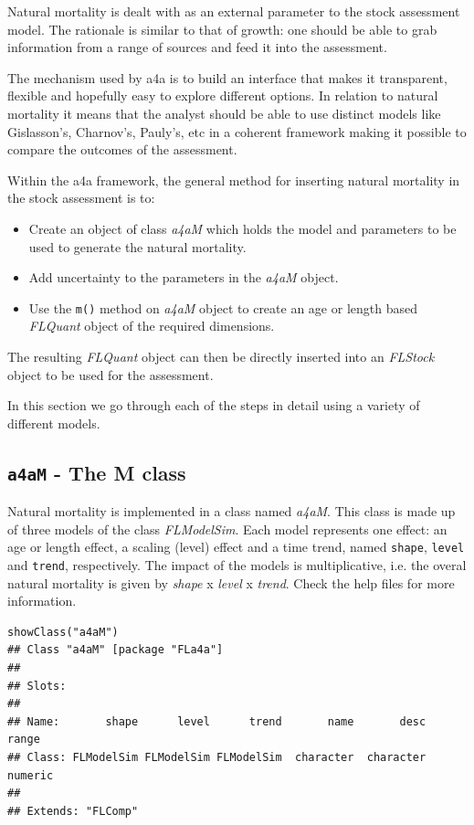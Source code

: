 \documentclass[a4paper,english,10pt]{article}\usepackage[]{graphicx}\usepackage[]{color}
\makeatletter
\newenvironment{kframe}{%
 \def\at@end@of@kframe{}%
 \ifinner\ifhmode%
  \def\at@end@of@kframe{\end{minipage}}%
  \begin{minipage}{\columnwidth}%
 \fi\fi%
 \def\FrameCommand##1{\hskip\@totalleftmargin \hskip-\fboxsep
 \colorbox{shadecolor}{##1}\hskip-\fboxsep
     \hskip-\linewidth \hskip-\@totalleftmargin \hskip\columnwidth}%
 \MakeFramed {\advance\hsize-\width
   \@totalleftmargin\z@ \linewidth\hsize
   \@setminipage}}%
 {\par\unskip\endMakeFramed%
 \at@end@of@kframe}
\newenvironment{knitrout}{}{} %
\newcommand{\code}[1]{{\texttt{#1}}}
\newcommand{\class}[1]{{\textit{#1}}}
\makeatother
\begin{document}
Natural mortality is dealt with as an external parameter to the stock assessment model. The rationale is similar to that of growth: one should be able to grab information from a range of sources and feed it into the assessment.

The mechanism used by a4a is to build an interface that makes it transparent, flexible and hopefully easy to explore different options. In relation to natural mortality it means that the analyst should be able to use distinct models like Gislasson's, Charnov's, Pauly's, etc in a coherent framework making it possible to compare the outcomes of the assessment. 

Within the a4a framework, the general method for inserting natural mortality in the stock assessment is to:

\begin{itemize}
    \item Create an object of class \class{a4aM} which holds the model and parameters to be used to generate the natural mortality.
    \item Add uncertainty to the parameters in the \class{a4aM} object.
    \item Use the \code{m()} method on \class{a4aM} object to create an age or length based \class{FLQuant} object of the required dimensions.
\end{itemize}

The resulting \class{FLQuant} object can then be directly inserted into an \class {FLStock} object to be used for the assessment.   

In this section we go through each of the steps in detail using a variety of different models.

\subsection{\code{a4aM} - The M class}

Natural mortality is implemented in a class named \class{a4aM}. This class is made up of three models of the class \class{FLModelSim}. Each model represents one effect: an age or length effect, a scaling (level) effect and a time trend, named \code{shape}, \code{level} and \code{trend}, respectively. The impact of the models is multiplicative, i.e. the overal natural mortality is given by \class{shape} x  \class{level} x \class{trend}. Check the help files for more information.

\begin{knitrout}
\color{fgcolor}\begin{kframe}
\begin{verbatim}
showClass("a4aM")
## Class "a4aM" [package "FLa4a"]
## 
## Slots:
##                                                                         
## Name:       shape      level      trend       name       desc      range
## Class: FLModelSim FLModelSim FLModelSim  character  character    numeric
## 
## Extends: "FLComp"
\end{verbatim}
\end{kframe}
\end{knitrout}
\end{document}
